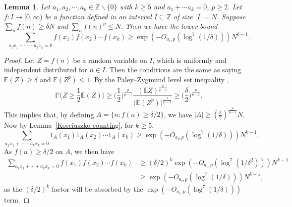 \documentclass[A4paper,reqno,oneside,12pt]{amsart}
\theoremstyle{plain}
\newtheorem{lemma}[theorem]{Lemma}
\theoremstyle{definition}
\newcommand{\Z}{\mathbb{Z}}
\begin{document}
\begin{lemma}\label{L^p Kosciuszko counting}
    Let $a_1, a_2, \cdots, a_k \in \mathbb{Z}\backslash \{0\}$ with $k\ge 5$ and $a_1 +\cdots a_k = 0$, $p\geq2$. Let $f:I\to[0,\infty)$ be a function defined in an interval $I\subseteq\mathbb{Z}$ of size $|I|=N$. Suppose $\sum_n f(n)\geq \delta N$ and $\sum_n f(n)^p\leq N$. 
    Then we have the lower bound
\[ 
\sum_{a_1x_1+\cdots +a_kx_k = 0} f(x_1) f(x_2)\cdots f(x_k) \ge \exp(-O_{a_i,p} ( \log^7(1/\delta)))N^{k-1}.
\] 
\end{lemma}
\begin{proof}
  Let $Z=f(n)$ be a random variable on $I$, which is uniformly and independent distributed for $n\in I$. Then the conditions are the same as saying $\mathbb E(Z)\geq\delta$ and $\mathbb E (Z^p)\leq 1$. By the Paley--Zygmund level set inequality \cite{PZineq},
  \[
\mathbb{P}\Big(Z\geq \frac12\mathbb E(Z)\Big)\geq \Big(\frac{1}{2}\Big)^{\frac{p}{p-1}}\frac{(\mathbb E Z)^{\frac{p}{p-1}}}{\mathbb (\mathbb E(Z^p))^{\frac{1}{p-1}}}\geq\Big(\frac{\delta}{2}\Big)^{\frac{p}{p-1}}. 
  \]
  This implies that, by defining $A=\{n: f(n)\geq \delta/2\}$, we have $|A|\geq (\frac{\delta}{2})^{\frac{p}{p-1}}N$. Now by Lemma~\ref{Kosciuszko counting}, for $k\geq 5$,
  \[ 
\sum_{a_1x_1+\cdots +a_kx_k = 0} 1_A(x_1) 1_A(x_2)\cdots 1_A(x_k) \ge \exp(-O_{a_i,p} ( \log^7(1/\delta)))N^{k-1}.
\]
As $f(n)\geq \delta/2$ on $A$, we then have
 \begin{align*}
\sum_{a_1x_1+\cdots +a_kx_k = 0} f(x_1) f(x_2)\cdots f(x_k) &\geq (\delta/2)^k\exp(-O_{a_i,p} ( \log^7(1/\delta^2)))N^{k-1}\\
&\geq \exp(-O_{a_i,p} ( \log^7(1/\delta)))N^{k-1},
\end{align*}
 as the $(\delta/2)^k$ factor will be absorbed by the $\exp(-O_{a_i,p} ( \log^7(1/\delta)))$ term. 
\end{proof}






\end{document}
